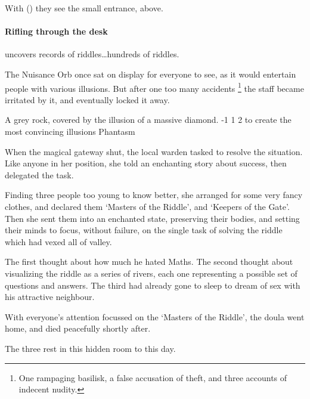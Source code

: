 With  (\tn[12]) they see the small entrance, above.

\paragraph{Rifling through the desk}
uncovers records of riddles\ldots hundreds of riddles.


\begin{exampletext}
  The Nuisance Orb once sat on display for everyone to see, as it would entertain people with various illusions.
  But after one too many accidents%
  \footnote{One rampaging basilisk, a false accusation of theft, and three accounts of indecent nudity.}
  the staff became irritated by it, and eventually locked it away.
\end{exampletext}

\setcounter{wounds}{2}
  {A grey rock, covered by the illusion of a massive diamond.}%
  {-1}%
  {1}%
  {2}%
  {to create the most convincing illusions}%
  {Phantasm}%
  {
    \setcounter{Fire}{3}
    \setcounter{Earth}{2}
    \setcounter{Fate}{1}
    \setcounter{Water}{1}
    \setcounter{Academics}{2}
    \setcounter{Wyldcrafting}{1}
  }%

\showStdSpells[
  \setcounter{diceNo}{0}
]


\begin{exampletext}
  When the magical gateway shut, the local \gls{warden} tasked  to resolve the situation.
  Like anyone in her position, she told an enchanting story about success, then delegated the task.

  Finding three people too young to know better, she arranged for some very fancy clothes, and declared them `Masters of the Riddle', and `Keepers of the Gate'.
  Then she sent them into an enchanted state, preserving their bodies, and setting their minds to focus, without failure, on the single task of solving the riddle which had vexed all of \gls{valley}.

  The first thought about how much he hated Maths.
  The second thought about visualizing the riddle as a series of rivers, each one representing a possible set of questions and answers.
  The third had already gone to sleep to dream of sex with his attractive neighbour.

  With everyone's attention focussed on the `Masters of the Riddle', the \gls{doula} went home, and died peacefully shortly after.

  The three rest in this hidden room to this day.
\end{exampletext}

